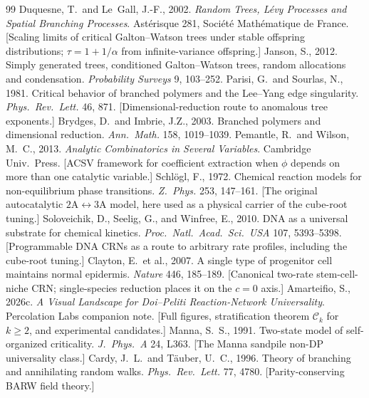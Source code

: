 \documentclass[11pt,a4paper]{article}
\theoremstyle{plain}
\theoremstyle{definition}
\begin{document}
\begin{thebibliography}{99}
 Duquesne, T.\ and Le~Gall, J.-F., 2002. \textit{Random Trees, Lévy Processes and Spatial Branching Processes}. Astérisque 281, Société Mathématique de France. [Scaling limits of critical Galton--Watson trees under stable offspring distributions; $\tau=1+1/\alpha$ from infinite-variance offspring.]
 Janson, S., 2012. Simply generated trees, conditioned Galton--Watson trees, random allocations and condensation. \textit{Probability Surveys} 9, 103--252.
 Parisi, G.\ and Sourlas, N., 1981. Critical behavior of branched polymers and the Lee--Yang edge singularity. \textit{Phys.\ Rev.\ Lett.} 46, 871. [Dimensional-reduction route to anomalous tree exponents.]
 Brydges, D.\ and Imbrie, J.Z., 2003. Branched polymers and dimensional reduction. \textit{Ann.\ Math.} 158, 1019--1039.
 Pemantle, R.\ and Wilson, M.~C., 2013. \textit{Analytic Combinatorics in Several Variables}. Cambridge Univ.\ Press. [ACSV framework for coefficient extraction when $\phi$ depends on more than one catalytic variable.]
 Schl\"ogl, F., 1972. Chemical reaction models for non-equilibrium phase transitions. \textit{Z.\ Phys.} 253, 147--161. [The original autocatalytic $2\mathrm{A}\leftrightarrow 3\mathrm{A}$ model, here used as a physical carrier of the cube-root tuning.]
 Soloveichik, D., Seelig, G., and Winfree, E., 2010. DNA as a universal substrate for chemical kinetics. \textit{Proc.\ Natl.\ Acad.\ Sci.\ USA} 107, 5393--5398. [Programmable DNA CRNs as a route to arbitrary rate profiles, including the cube-root tuning.]
 Clayton, E.\ et al., 2007. A single type of progenitor cell maintains normal epidermis. \textit{Nature} 446, 185--189. [Canonical two-rate stem-cell-niche CRN; single-species reduction places it on the $c=0$ axis.]
 Amarteifio, S., 2026c. \textit{A Visual Landscape for Doi--Peliti Reaction-Network Universality}. Percolation Labs companion note. [Full figures, stratification theorem $\mathcal{C}_k$ for $k\geq 2$, and experimental candidates.]
 Manna, S.~S., 1991. Two-state model of self-organized criticality. \textit{J.\ Phys.\ A} 24, L363. [The Manna sandpile non-DP universality class.]
 Cardy, J.~L.\ and T\"auber, U.~C., 1996. Theory of branching and annihilating random walks. \textit{Phys.\ Rev.\ Lett.} 77, 4780. [Parity-conserving BARW field theory.]

\end{thebibliography}
\end{document}
